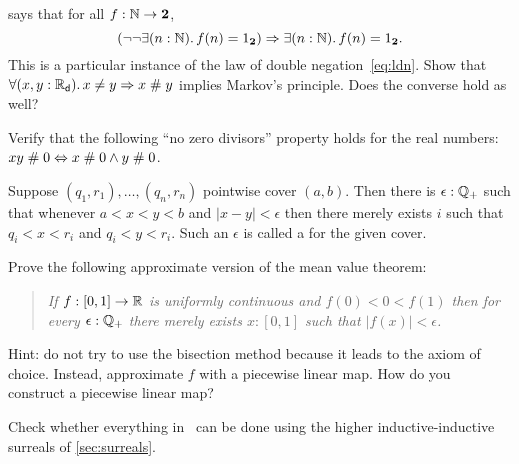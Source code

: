 
\begin{ex} \label{ex:reals-apart-neq-MP}
  says that for all $f : \mathbb{N} \to \mathbf{2}$,
  \begin{equation*}
    (\lnot \lnot \exis{n : \nat} f(n) = \btrue)
    \Rightarrow
    \exis{n : \nat} f(n) = \btrue.
  \end{equation*}
  This is a particular instance of the law of double negation~\eqref{eq:ldn}. Show that
  $\fall{x, y: \RD} x \neq y \Rightarrow x \apart y$ implies Markov's principle. Does the
  converse hold as well?
\end{ex}

\begin{ex} \label{ex:reals-apart-zero-divisors}
  Verify that the following ``no zero divisors'' property holds for the real numbers:
  $x y \mathrel{\#} 0 \Leftrightarrow x \mathrel{\#} 0 \land y \mathrel{\#} 0$.
\end{ex}

\begin{ex} \label{ex:finite-cover-lebesgue-number}
  Suppose $(q_1, r_1), \ldots, (q_n, r_n)$ pointwise cover $(a, b)$. Then there is
  $\epsilon : \mathbb{Q}_{+}$ such that whenever $a < x < y < b$ and $|x - y| < \epsilon$
  then there merely exists $i$ such that $q_i < x < r_i$ and $q_i < y < r_i$. Such an
  $\epsilon$ is called a 
  for the given cover.
\end{ex}

\begin{ex} \label{ex:mean-value-theorem}
  Prove the following approximate version of the mean value theorem:
  \begin{quote}
    \emph{
      If $f : [0,1] \to \mathbb{R}$ is uniformly continuous and $f(0) < 0 < f(1)$ then
      for every $\epsilon : \mathbb{Q}_{+}$ there merely exists $x : [0,1]$ such that $|f(x)| <
      \epsilon$.
    }
  \end{quote}
  Hint: do not try to use the bisection method because it leads to the axiom of choice.
  Instead, approximate $f$ with a piecewise linear map. How do you construct a piecewise
  linear map?
\end{ex}

\begin{ex}
  Check whether everything in~\cite{knuth74:_surreal_number} can be done using the higher
  inductive-inductive surreals of \autoref{sec:surreals}.
\end{ex}


